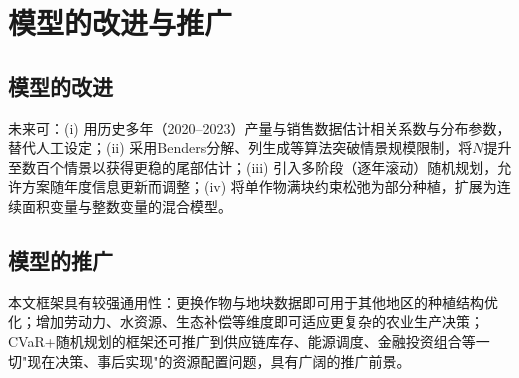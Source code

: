 \section{模型的改进与推广}

\subsection{模型的改进}

未来可：(i) 用历史多年（2020--2023）产量与销售数据估计相关系数与分布参数，替代人工设定；(ii) 采用Benders分解、列生成等算法突破情景规模限制，将$N$提升至数百个情景以获得更稳的尾部估计；(iii) 引入多阶段（逐年滚动）随机规划，允许方案随年度信息更新而调整；(iv) 将单作物满块约束松弛为部分种植，扩展为连续面积变量与整数变量的混合模型。

\subsection{模型的推广}

本文框架具有较强通用性：更换作物与地块数据即可用于其他地区的种植结构优化；增加劳动力、水资源、生态补偿等维度即可适应更复杂的农业生产决策；CVaR+随机规划的框架还可推广到供应链库存、能源调度、金融投资组合等一切"现在决策、事后实现"的资源配置问题，具有广阔的推广前景。
